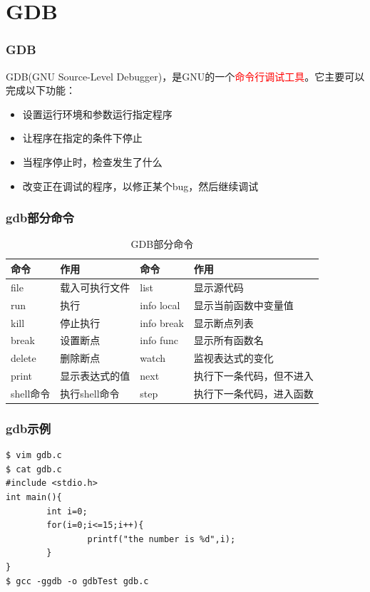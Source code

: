 \documentclass{beamer}
\begin{document}
\section{GDB}
\begin{frame}
\frametitle{GDB}
GDB(GNU Source-Level Debugger)，是GNU的一个\textcolor{red}{命令行调试工具}。它主要可以完成以下功能：
\begin{itemize}
\item
设置运行环境和参数运行指定程序
\item
让程序在指定的条件下停止
\item
当程序停止时，检查发生了什么
\item
改变正在调试的程序，以修正某个bug，然后继续调试
\end{itemize}
\end{frame}
\begin{frame}
\frametitle{gdb部分命令}
\begin{table}
\begin{tabular}{l l l l }
\toprule
\textbf{命令} & \textbf{作用} & \textbf{命令} & \textbf{作用}\\
\midrule
file & 载入可执行文件 & list & 显示源代码 \\
run & 执行 & info local & 显示当前函数中变量值 \\
kill & 停止执行 & info break & 显示断点列表 \\
break & 设置断点 & info func & 显示所有函数名 \\
delete & 删除断点 & watch & 监视表达式的变化 \\
print & 显示表达式的值 & next & 执行下一条代码，但不进入 \\
shell命令 & 执行shell命令 & step & 执行下一条代码，进入函数 \\
\bottomrule
\end{tabular}
\caption{GDB部分命令}
\end{table}
\end{frame}

\begin{frame}[fragile]
\frametitle{gdb示例}
\begin{lstlisting}
$ vim gdb.c
$ cat gdb.c
#include <stdio.h>
int main(){
        int i=0;
        for(i=0;i<=15;i++){
                printf("the number is %d",i);
        }
}
$ gcc -ggdb -o gdbTest gdb.c
\end{lstlisting}
\end{frame}
\end{document}
